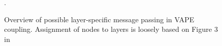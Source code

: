 \begin{figure}
  \centering

  \small

  \newcommand{\w}[1]{\textcolor{white}{#1}}
  \def\svgwidth{0.9\textwidth}


  \caption{Overview of possible layer-specific message passing in \textsf{VAPE} coupling. Assignment of nodes to layers is loosely based on Figure 3 in \cite{Shipp2016}}.
  \label{\figlabel}
\end{figure}